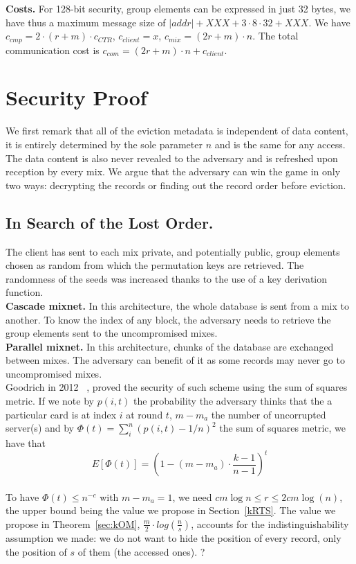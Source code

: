 \documentclass[USenglish,oneside,twocolumn]{article}
\begin{document}
\noindent\textbf{Costs.} For 128-bit security, group elements can be expressed in just 32 bytes, we have thus a maximum message size of $|addr|+XXX + 3 \cdot 8 \cdot 32 + XXX$. We have $c_{cmp} = 2\cdot (r+m) \cdot c_{CTR} $, $c_{client}=x$, $c_{mix}= (2r+m)\cdot n$. The total communication cost is $c_{com}= (2r+m)\cdot n + c_{client}$.

\section{Security Proof}\label{Security}

We first remark that all of the eviction metadata is independent of data content, it is entirely determined by the sole parameter $n$ and is the same for any access. The data content is also never revealed to the adversary and is refreshed upon reception by every mix.
We argue that the adversary can win the game in only two ways: decrypting the records or finding out the record order before eviction. 

\subsection{In Search of the Lost Order.}
The client has sent to each mix private, and potentially public, group elements chosen as random from which the permutation keys are retrieved. The randomness of the seeds was increased thanks to the use of a key derivation function.\\

\noindent\textbf{Cascade mixnet.}
In this architecture, the whole database is sent from a mix to another. To know the index of any block, the adversary needs to retrieve the group elements sent to the uncompromised mixes. \\

\noindent\textbf{Parallel mixnet.}
In this architecture, chunks of the database are exchanged between mixes. The adversary can benefit of it as some records may never go to uncompromised mixes.\\
Goodrich in 2012 ~\cite{goodrich2012anonymous}, proved the security of such scheme using the sum of squares metric. If we note by $p(i,t)$ the probability the adversary thinks that the a particular card is at index $i$ at round $t$, $m-m_a$ the number of uncorrupted server(s) and by $\Phi(t)= \sum_{i}^{n}\left (p(i,t) - 1/n \right)^2$ the sum of squares metric, we have that $$E[\Phi(t)] = \left (1 - (m-m_a) \cdot \frac{k-1}{n-1}\right )^{t}$$\\
To have $\Phi(t) \leq n^{-c}$ with $m-m_a=1$, we need $cm \log n \leq r \leq 2cm \log(n)$, the upper bound being the value we propose in Section~\ref{kRTS}. The value we propose in Theorem~\ref{sec:kOM}, $\frac{m}{2} \cdot log\left ( \frac{n}{s} \right )$, accounts for the indistinguishability assumption we made: we do not want to hide the position of every record, only the position of $s$ of them (the accessed ones). ?
\end{document}
